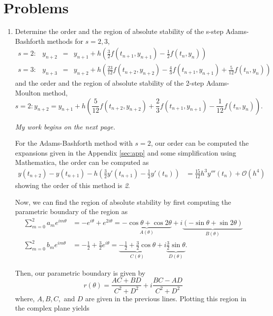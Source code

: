 \documentclass[a4paper,12pt]{article}
\newcommand{\bigO}{\mathcal{O}}
\begin{document}
\section{Problems}
\begin{enumerate}[label = (\arabic*)]
	\item Determine the order and the region of absolute stability of the s-step Adams-Bashforth methods for $ s = 2, 3 $,
	\[
		\begin{array}{crcl}
			s = 2: & y_{n + 2} & = & y_{n + 1} + h \left(\frac{3}{2} f(t_{n + 1}, y_{n + 1}) - \frac{1}{2}f(t_n, y_n)\right) \\
			s = 3: & y_{n + 3} & = & y_{n + 2} + h \left( \frac{23}{12} f(t_{n + 2}, y_{n + 2}) - \frac{4}{3} f(t_{n + 1}, y_{n + 1}) + \frac{5}{12} f(t_n, y_n) \right)
		\end{array}
	\]
	and the order and the region of absolute stability of the 2-step Adams-Moulton method,
	\[
		s = 2: y_{n + 2} = y_{n + 1} + h \left( \frac{5}{12} f(t_{n + 2}, y_{n + 2}) + \frac{2}{3} f(t_{n + 1}, y_{n + 1}) - \frac{1}{12}f(t_n, y_n) \right).
	\]
	\begin{center}
		\emph{My work begins on the next page.}
	\end{center}
	
	\newpage
	For the Adams-Bashforth method with $ s = 2 $, our order can be computed  the expansions given in the Appendix \ref{sec:app} and some simplification using Mathematica, the order can be computed as
	\begin{align*}
		y(t_{n + 2}) - y(t_{n + 1}) - h \left(\frac{3}{2} y'(t_{n + 1}) - \frac{1}{2} y'(t_n) \right) &= \frac{15}{12} h^3 y'''(t_n) + \bigO(h^4)
 	\end{align*}
	showing the order of this method is \emph{2}.
	
	Now, we can find the region of absolute stability by first computing the parametric boundary of the region as
	\begin{align*}
		\sum_{m = 0}^{2} a_m e^{i m \theta} &= -e^{i \theta} + e^{2 i \theta} = \underbrace{-\cos\theta +\cos 2\theta}_{A(\theta)} + i \underbrace{(-\sin \theta + \sin 2\theta)}_{B(\theta)} \\
		\sum_{m = 0}^{2} b_m e^{i m \theta} &= -\frac{1}{2} + \frac{3}{2} e^{i \theta} = \underbrace{-\frac{1}{2} + \frac{3}{2}\cos\theta}_{C(\theta)} + i \underbrace{\frac{3}{2}\sin\theta}_{D(\theta)}.
	\end{align*}

	Then, our parametric boundary is given by 
	\[
		r(\theta) = \frac{AC + BD}{C^2 + D^2} + i \frac{BC - AD}{C^2 + D^2}
	\]
	where, $ A, B, C, $ and $ D $ are given in the previous lines. Plotting this region in the complex plane yields
	

\end{enumerate}
\end{document}
